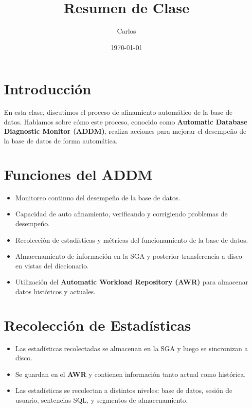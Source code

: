 \documentclass{article}
\title{Resumen de Clase}
\author{Carlos}
\date{\today}
\begin{document}
\maketitle

\section{Introducción}
En esta clase, discutimos el proceso de afinamiento automático de la base de datos. Hablamos sobre cómo este proceso, conocido como \textbf{Automatic Database Diagnostic Monitor (ADDM)}, realiza acciones para mejorar el desempeño de la base de datos de forma automática.

\section{Funciones del ADDM}
\begin{itemize}
    \item Monitoreo continuo del desempeño de la base de datos.
    \item Capacidad de auto afinamiento, verificando y corrigiendo problemas de desempeño.
    \item Recolección de estadísticas y métricas del funcionamiento de la base de datos.
    \item Almacenamiento de información en la SGA y posterior transferencia a disco en vistas del diccionario.
    \item Utilización del \textbf{Automatic Workload Repository (AWR)} para almacenar datos históricos y actuales.
\end{itemize}

\section{Recolección de Estadísticas}
\begin{itemize}
    \item Las estadísticas recolectadas se almacenan en la SGA y luego se sincronizan a disco.
    \item Se guardan en el \textbf{AWR} y contienen información tanto actual como histórica.
    \item Las estadísticas se recolectan a distintos niveles: base de datos, sesión de usuario, sentencias SQL, y segmentos de almacenamiento.
\end{itemize}
\end{document}

